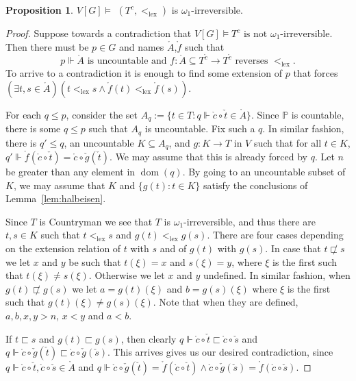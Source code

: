 \documentclass[10pt]{amsart}
\theoremstyle{definition}
\newtheorem{proposition}[theorem]{Proposition}
\theoremstyle{remark}
\newcommand{\seb}{\subseteq}
\newcommand\lex{\mathrm{lex}}
\renewcommand{\P}{\mathbb{P}}
\newcommand{\1}{\mathbbm{1}}
\newcommand{\ck}[1]{\check{#1}}
\newcommand{\dt}[1]{\mathring{#1}}
\newcommand{\tle}{\sqsubset}
\DeclareMathOperator{\dom}{dom}
\begin{document}
\begin{proposition}
  $V[G] \models$ $(T^{c},<_{\lex})$ is $\omega_{1}$-irreversible.
\end{proposition}
\begin{proof}
  Suppose towards a contradiction
  that $V[G] \models T^{c} \text{ is not $\omega_{1}$-irreversible}$.
  Then there must be $p \in G$ and names $\dt{A}$,$\dt{f}$ such
  that
  \[p \Vdash \dt{A} \text{ is uncountable and }
    f : \dt{A} \seb T^{\dt{c}} \to T^{\dt{c}} \text{ reverses } <_{\lex}.\]
  To arrive to a contradiction it is enough to find some extension
  of $p$ that forces
  $(\exists t,s \in \dt{A})(t <_{\lex} s \land \dt{f}(t) <_{\lex} \dt{f}(s))$.

  For each $q \le p$, consider the
  set $A_{q} := \{t \in T : q \Vdash \dt{c} \circ \ck{t} \in \dt{A}\}$. Since $\P$ is
  countable, there is some $q \le p$ such that $A_{q}$ is uncountable. Fix such a $q$.
  In similar fashion, there is $q' \le q$, an uncountable $K \seb A_{q}$,
  and $g : K \to T$ in $V$ such that for all $t \in K$,
  $q' \Vdash \dt{f}(\dt{c} \circ \ck{t}) = \dt{c} \circ \ck{g}(\ck{t})$. We may
  assume that this is already forced by $q$. Let $n$ be greater
  than any element in $\dom(q)$. By going to an uncountable
  subset of $K$, we may assume that $K$ and $\{g(t) : t \in K\}$ satisfy
  the conclusions of Lemma~\ref{lem:halbeisen}.

  Since $T$ is Countryman we see that $T$ is
  $\omega_{1}$-irreversible, and thus there are $t,s \in K$
  such that $t <_{\lex} s$ and $g(t) <_{\lex} g(s)$. There are four
  cases depending on the extension relation of $t$ with $s$ and
  of $g(t)$ with $g(s)$. In
  case that $t \not\tle s$ we let $x$ and $y$ be such that
  $t(\xi) = x$ and $s(\xi) = y$, where $\xi$ is the first such that
  $t(\xi) \neq s(\xi)$. Otherwise we let $x$ and $y$ undefined.
  In similar fashion, when $g(t) \not\tle g(s)$
  we let $a = g(t)(\xi)$ and $b = g(s)(\xi)$ where
  $\xi$ is the first such that $g(t)(\xi) \neq g(s)(\xi)$.
  Note that when they are defined,
  $a,b,x,y > n$, $x < y$ and $a < b$.

  If $t \tle s$ and $g(t) \tle g(s)$, then clearly
  $q \Vdash \dt{c} \circ \ck{t} \tle \dt{c} \circ \ck{s}$ and
  $q \Vdash \dt{c} \circ \ck{g}(\ck{t}) \tle \dt{c} \circ \ck{g}(\ck{s})$.
  This arrives gives us our desired contradiction, since
  $q \Vdash \dt{c} \circ \ck{t}, \dt{c} \circ \ck{s} \in \dt{A}$ and
  $q \Vdash \dt{c} \circ \ck{g}(\ck{t}) = \dt{f}(\dt{c} \circ \ck{t}) \land
  \dt{c} \circ \ck{g}(\ck{s}) = \dt{f}(\dt{c} \circ \ck{s})$.


\end{proof}
\end{document}
